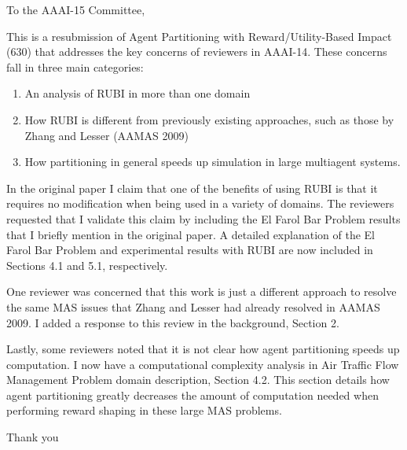 \documentclass[10pt,a4paper]{letter}
\begin{document}
 
\begin{letter}{} 
\opening{To the AAAI-15 Committee,} 
 
This is a resubmission of Agent Partitioning with Reward/Utility-Based Impact (630) that addresses the key concerns of reviewers in AAAI-14. These concerns fall in three main categories:

\begin{enumerate} 
\item An analysis of RUBI in more than one domain
\item How RUBI is different from previously existing approaches, such as those by Zhang and Lesser (AAMAS 2009)
\item How partitioning in general speeds up simulation in large multiagent systems. 
\end{enumerate} 

In the original paper I claim that one of the benefits of using RUBI is that it requires no modification when being used in a variety of domains. The reviewers requested that I validate this claim by including the El Farol Bar Problem results that I briefly mention in the original paper. A detailed explanation of the El Farol Bar Problem and experimental results with RUBI are now included in Sections 4.1 and 5.1, respectively.

One reviewer was concerned that this work is just a different approach to resolve the same MAS issues that Zhang and Lesser had already resolved in AAMAS 2009. I added a response to this review in the background, Section 2.

Lastly, some reviewers noted that it is not clear how agent partitioning speeds up computation. I now have a computational complexity analysis in Air Traffic Flow Management Problem domain description, Section 4.2. This section details how agent partitioning greatly decreases the amount of computation needed when performing reward shaping in these large MAS problems.

\closing{Thank you}
\end{letter} 
\end{document}
